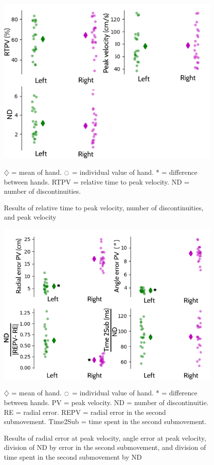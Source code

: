 \documentclass[man,a4paper,12pt,floatsintext]{apa6}
\begin{document}
\begin{figure}[p] %
\includegraphics[width=\linewidth]{figures/f5.png}
\caption{Results of relative time to peak velocity, number of discontinuities, and peak velocity}{$\diamondsuit$ = mean of hand. $\ocircle$ = individual value of hand. * = difference between hands. RTPV = relative time to peak velocity. ND = number of discontinuities.}
\label{fig5}
\end{figure} 


\begin{figure}[p] %
\includegraphics[width=\linewidth]{figures/f6.png}
\caption{Results of radial error at peak velocity, angle error at peak velocity, division of ND by error in the second submovement, and division of time spent in the second submovement by ND}{$\diamondsuit$ = mean of hand. $\ocircle$ = individual value of hand. * = difference between hands. PV = peak velocity. ND = number of discontinuitie. RE = radial error. REPV = radial error in the second submovement. Time2Sub = time spent in the second submovement.}
\label{fig6}
\end{figure} 
\end{document}
